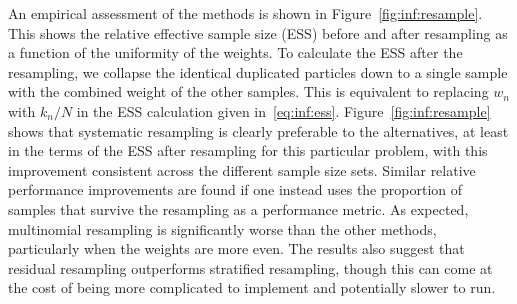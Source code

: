An empirical assessment of the methods is shown in Figure~\ref{fig:inf:resample}.  This shows
the relative effective sample size (ESS) before and after resampling as a function of the uniformity of
the weights.  To calculate the ESS after the resampling, we collapse the identical duplicated
particles down to a single sample with the combined weight of the other samples.  This is equivalent
to replacing $w_n$ with $k_n/N$ in the ESS calculation given in~\eqref{eq:inf:ess}.
Figure~\ref{fig:inf:resample} shows that systematic resampling is clearly preferable to the alternatives, at least
in the terms of the ESS after resampling for this particular problem, with this improvement consistent across the different
sample size sets.  Similar relative performance improvements are found if one instead uses the proportion of samples that
survive the resampling as a performance metric.
As expected, multinomial resampling is significantly worse than the other
methods, particularly when the weights are more even.  The results also suggest that residual
resampling outperforms stratified resampling, though this can come at the cost of being more
complicated to implement and potentially slower to run.  
